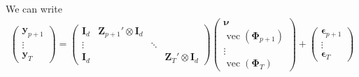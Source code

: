 \documentclass[fleqn]{article}
\begin{document}
We can write
\begin{align*}
    \begin{pmatrix}
        \bm y_{p+1} \\
        \vdots \\
        \bm y_T
    \end{pmatrix}
    =
    \begin{pmatrix}
        \bm I_d & \bm Z_{p+1}' \otimes \bm I_d &        &                                 \\
        \vdots  &                                 & \ddots &                              \\
        \bm I_d &                                 &        & \bm Z_{T}' \otimes \bm I_d
    \end{pmatrix}
    \begin{pmatrix}
        \bm \nu \\
        \operatorname{vec}(\bm \Phi_{p+1}) \\
        \vdots \\
        \operatorname{vec}(\bm \Phi_T)
    \end{pmatrix}
    +
    \begin{pmatrix}
        \bm \epsilon_{p+1} \\
        \vdots \\
        \bm \epsilon_T
    \end{pmatrix}
\end{align*}
\end{document}
